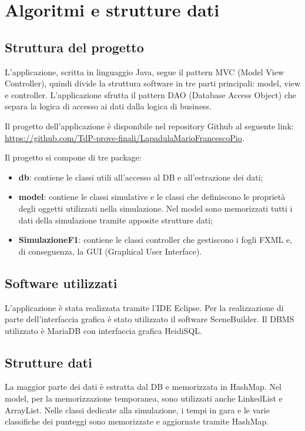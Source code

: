 
\chapter{Algoritmi e strutture dati}

\section{Struttura del progetto}
L’applicazione, scritta in linguaggio Java, segue il pattern MVC (Model View Controller), quindi divide la struttura software in tre parti principali: model, view e controller. L’applicazione sfrutta il pattern DAO (Database Access Object) che separa la logica di accesso ai dati dalla logica di business.

Il progetto dell’applicazione è disponibile nel repository Github al seguente link: \url{https://github.com/TdP-prove-finali/LapadulaMarioFrancescoPio}.

Il progetto si compone di tre package:
\begin{itemize}
    \item \textbf{db}: contiene le classi utili all’accesso al DB e all’estrazione dei dati;
    \item \textbf{model}: contiene le classi simulative e le classi che definiscono le proprietà degli oggetti utilizzati nella simulazione. Nel model sono memorizzati tutti i dati della simulazione tramite apposite strutture dati;
    \item \textbf{SimulazioneF1}: contiene le classi controller che gestiscono i fogli FXML e, di conseguenza, la GUI (Graphical User Interface).
\end{itemize}

\section{Software utilizzati}
L’applicazione è stata realizzata tramite l’IDE Eclipse. Per la realizzazione di parte dell’interfaccia grafica è stato utilizzato il software SceneBuilder. Il DBMS utilizzato è MariaDB con interfaccia grafica HeidiSQL.

\section{Strutture dati}
La maggior parte dei dati è estratta dal DB e memorizzata in HashMap. Nel model, per la memorizzazione temporanea, sono utilizzati anche LinkedList e ArrayList. Nelle classi dedicate alla simulazione, i tempi in gara e le varie classifiche dei punteggi sono memorizzate e aggiornate tramite HashMap.


